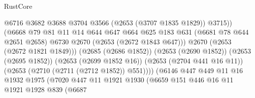 \begin{lexlean}{RustCore}
\begin{coremodule}
                                              @6716
                                              @3682
                                              @3688
                                              @3704
                                              @3566
                                              (@2653 (@3707 @1835 @1829))
                                              @3715))
                                          (@6668
                                            @79
                                            @81
                                            @11
                                            @14
                                            @644
                                            @647
                                            @664
                                            @625
                                            @183
                                            @631
                                            (@6681 @78 @644 @2651 @2658)
                                            @6730
                                            @2670
                                            (@2653 (@2672 @1843 @647)))
                                          @2670
                                          (@2653 (@2672 @1821 @1849)))
                                        (@2685 (@2686 @1852))
                                        (@2653 (@2690 @1852))
                                        (@2653 (@2695 @1852))
                                        (@2653 (@2699 @1852 @16))
                                        (@2653 (@2704 @441 @16 @11))
                                        (@2653 (@2710 (@2711 (@2712 @1852)) @551))))
                                    (@6146
                                      @447
                                      @449
                                      @11
                                      @16
                                      @1932
                                      @1975
                                      (@7020
                                        @447
                                        @11
                                        @1921
                                        @1930
                                        (@6659
                                          @151
                                          @446
                                          @16
                                          @11
                                          @1921
                                          @1928
                                          @839
                                          (@6687

\end{coremodule}
\end{lexlean}
